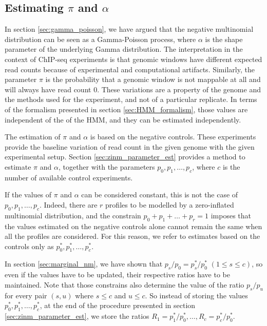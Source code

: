 \documentclass[12pt]{article}
\begin{document}
\subsection{Estimating $\pi$ and $\alpha$}

    In section \ref{sec:gamma_poisson}, we have argued that the
    negative multinomial distribution can be seen as a Gamma-Poisson
    process, where $\alpha$ is the shape parameter of the underlying
    Gamma distribution. The interpretation in the context of ChIP-seq
    experiments is that genomic windows have different expected
    read counts because of experimental and computational artifacts.
    Similarly, the parameter $\pi$ is the probability that a genomic
    window is not mappable at all and will always have read count 0.
    These variations are a property of the genome and the methods
    used for the experiment, and not of a particular replicate.
    In terms of the formalism presented in section
    \ref{sec:HMM_formalism}, those values are independent of the
    of the HMM, and they can be estimated independently.

    The estimation of $\pi$ and $\alpha$ is based on the negative
    controls. These experiments provide the baseline variation of
    read count in the given genome with the given experimental setup.
    Section \ref{sec:zinm_parameter_est} provides a method to
    estimate $\pi$ and $\alpha$, together with the parameters
    $p_0, p_1, \ldots, p_c$, where $c$ is the number of available
    control experiments.

    If the values of $\pi$ and $\alpha$ can be considered constant,
    this is not the case of $p_0, p_1, \ldots, p_c$. Indeed, there
    are $r$ profiles to be modelled by a zero-inflated multinomial
    distribution, and the constrain $p_0 + p_1 + \ldots + p_r = 1$
    imposes that the values estimated on the negative controls
    alone cannot remain the same when all the profiles are
    considered. For this reason, we refer to estimates based on the
    controls only as $p_0^*, p_1^*, \ldots, p_c^*$.

    In section \ref{sec:marginal_nm}, we have shown that
    $p_s/p_0 = p_s^*/p_0^*$ $(1 \leq s \leq c)$, so even if the
    values have to be updated, their respective ratios have to be
    maintained. Note that those constrains also determine the value
    of the ratio $p_s / p_u$ for every pair $(s,u)$ where $s \leq c$
    and $u \leq c$. So instead of storing the values
    $p_0^*, p_1^*, \ldots, p_c^*$, at the end of the procedure
    presented in section \ref{sec:zinm_parameter_est}, we store the
    ratios $R_1=p_1^*/p_0^*, \ldots, R_c=p_c^*/p_0^*$.
\end{document}
